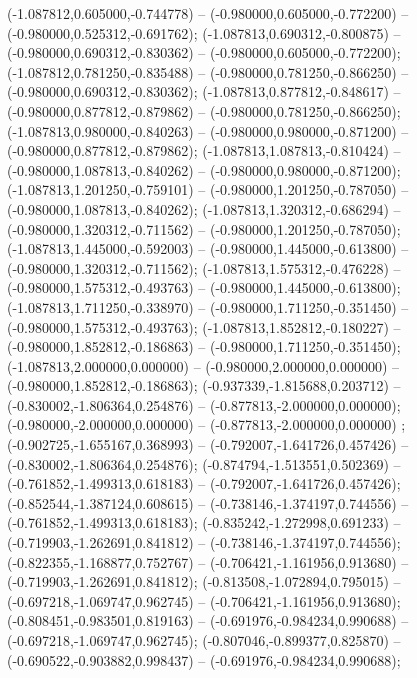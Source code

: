  (-1.087812,0.605000,-0.744778) -- (-0.980000,0.605000,-0.772200) -- (-0.980000,0.525312,-0.691762);
 (-1.087813,0.690312,-0.800875) -- (-0.980000,0.690312,-0.830362) -- (-0.980000,0.605000,-0.772200);
 (-1.087812,0.781250,-0.835488) -- (-0.980000,0.781250,-0.866250) -- (-0.980000,0.690312,-0.830362);
 (-1.087813,0.877812,-0.848617) -- (-0.980000,0.877812,-0.879862) -- (-0.980000,0.781250,-0.866250);
 (-1.087813,0.980000,-0.840263) -- (-0.980000,0.980000,-0.871200) -- (-0.980000,0.877812,-0.879862);
 (-1.087813,1.087813,-0.810424) -- (-0.980000,1.087813,-0.840262) -- (-0.980000,0.980000,-0.871200);
 (-1.087813,1.201250,-0.759101) -- (-0.980000,1.201250,-0.787050) -- (-0.980000,1.087813,-0.840262);
 (-1.087813,1.320312,-0.686294) -- (-0.980000,1.320312,-0.711562) -- (-0.980000,1.201250,-0.787050);
 (-1.087813,1.445000,-0.592003) -- (-0.980000,1.445000,-0.613800) -- (-0.980000,1.320312,-0.711562);
 (-1.087813,1.575312,-0.476228) -- (-0.980000,1.575312,-0.493763) -- (-0.980000,1.445000,-0.613800);
 (-1.087813,1.711250,-0.338970) -- (-0.980000,1.711250,-0.351450) -- (-0.980000,1.575312,-0.493763);
 (-1.087813,1.852812,-0.180227) -- (-0.980000,1.852812,-0.186863) -- (-0.980000,1.711250,-0.351450);
 (-1.087813,2.000000,0.000000) -- (-0.980000,2.000000,0.000000) -- (-0.980000,1.852812,-0.186863);
 (-0.937339,-1.815688,0.203712) -- (-0.830002,-1.806364,0.254876) -- (-0.877813,-2.000000,0.000000);
 (-0.980000,-2.000000,0.000000) -- (-0.877813,-2.000000,0.000000) ;
 (-0.902725,-1.655167,0.368993) -- (-0.792007,-1.641726,0.457426) -- (-0.830002,-1.806364,0.254876);
 (-0.874794,-1.513551,0.502369) -- (-0.761852,-1.499313,0.618183) -- (-0.792007,-1.641726,0.457426);
 (-0.852544,-1.387124,0.608615) -- (-0.738146,-1.374197,0.744556) -- (-0.761852,-1.499313,0.618183);
 (-0.835242,-1.272998,0.691233) -- (-0.719903,-1.262691,0.841812) -- (-0.738146,-1.374197,0.744556);
 (-0.822355,-1.168877,0.752767) -- (-0.706421,-1.161956,0.913680) -- (-0.719903,-1.262691,0.841812);
 (-0.813508,-1.072894,0.795015) -- (-0.697218,-1.069747,0.962745) -- (-0.706421,-1.161956,0.913680);
 (-0.808451,-0.983501,0.819163) -- (-0.691976,-0.984234,0.990688) -- (-0.697218,-1.069747,0.962745);
 (-0.807046,-0.899377,0.825870) -- (-0.690522,-0.903882,0.998437) -- (-0.691976,-0.984234,0.990688);
